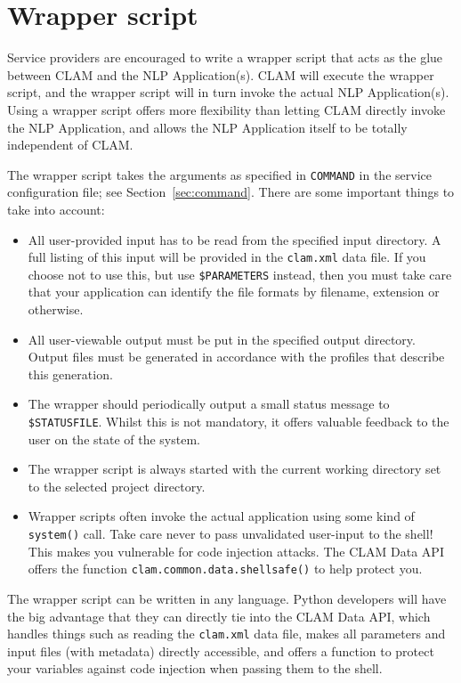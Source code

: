 \documentclass[a4paper,12pt]{report}
\begin{document}
\section{Wrapper script}

Service providers are encouraged to write a wrapper script that acts as the
glue between CLAM and the NLP Application(s). CLAM will execute the wrapper
script, and the wrapper script will in turn invoke the actual NLP
Application(s). Using a wrapper script offers more flexibility than letting
CLAM directly invoke the NLP Application, and allows the NLP Application itself
to be totally independent of CLAM. 

The wrapper script takes the arguments as specified in \texttt{COMMAND} in the
service configuration file; see Section~\ref{sec:command}. There are some
important things to take into account:

\begin{itemize}
\item All user-provided input has to be read from the specified input directory. A full listing of this input will be provided in the \texttt{clam.xml} data file. If you choose not to use this, but use \texttt{\$PARAMETERS} instead, then you must take care that your application can identify the file formats by filename, extension or otherwise.
\item All user-viewable output must be put in the specified output directory. Output files must be generated in accordance with the profiles that describe this generation. 
\item The wrapper should periodically output a small status message to \texttt{\$STATUSFILE}. Whilst this is not mandatory, it offers valuable feedback to the user on the state of the system. 
\item The wrapper script is always started with the current working directory set to the selected project directory.
\item Wrapper scripts often invoke the actual application using some kind of
  \texttt{system()} call. Take care never to pass unvalidated user-input to the shell! This makes you vulnerable
  for code injection attacks. The CLAM Data API offers the function
  \texttt{clam.common.data.shellsafe()} to help protect you.
\end{itemize}

The wrapper script can be written in any language. Python developers will have
the big advantage that they can directly tie into the CLAM Data API, which
handles things such as reading the \texttt{clam.xml} data file, makes all
parameters and input files (with metadata) directly accessible, and offers a
function to protect your variables against code injection when passing them to
the shell.
\end{document}
